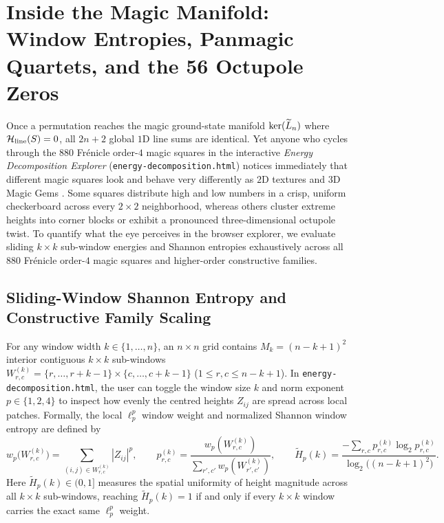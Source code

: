 \section{Inside the Magic Manifold: Window Entropies, Panmagic Quartets, and the 56 Octupole Zeros}
\label{sec:windows}

Once a permutation reaches the magic ground-state manifold $\ker(\widetilde{L}_n)$ where $\mathcal{H}_{\mathrm{line}}(S) = 0$, all $2n+2$ global $1\mathrm{D}$ line sums are identical. Yet anyone who cycles through the $880$ Fr\'enicle order-$4$ magic squares in the interactive \emph{Energy Decomposition Explorer} (\texttt{energy-decomposition.html}) notices immediately that different magic squares look and behave very differently as $2\mathrm{D}$ textures and $3\mathrm{D}$ Magic Gems \cite{dudeney1917amusements,ollerenshaw1998most,cameron2013signatura}. Some squares distribute high and low numbers in a crisp, uniform checkerboard across every $2\times 2$ neighborhood, whereas others cluster extreme heights into corner blocks or exhibit a pronounced three-dimensional octupole twist. To quantify what the eye perceives in the browser explorer, we evaluate sliding $k\times k$ sub-window energies and Shannon entropies exhaustively across all $880$ Fr\'enicle order-$4$ magic squares and higher-order constructive families.

\subsection{Sliding-Window Shannon Entropy and Constructive Family Scaling}

For any window width $k \in \{1,\dots,n\}$, an $n\times n$ grid contains $M_k = (n-k+1)^2$ interior contiguous $k\times k$ sub-windows $W_{r,c}^{(k)} = \{r,\dots,r+k-1\}\times\{c,\dots,c+k-1\}$ ($1 \le r,c \le n-k+1$). In \texttt{energy-decomposition.html}, the user can toggle the window size $k$ and norm exponent $p \in \{1,2,4\}$ to inspect how evenly the centred heights $Z_{ij}$ are spread across local patches. Formally, the local $\ell_p^p$ window weight and normalized Shannon window entropy are defined by
\begin{equation}
  w_p\bigl(W_{r,c}^{(k)}\bigr) = \sum_{(i,j)\in W_{r,c}^{(k)}} |Z_{ij}|^p, \qquad
  p_{r,c}^{(k)} = \frac{w_p(W_{r,c}^{(k)})}{\sum_{r',c'} w_p(W_{r',c'}^{(k)})}, \qquad
  \widetilde{H}_p(k) = \frac{-\sum_{r,c} p_{r,c}^{(k)} \log_2 p_{r,c}^{(k)}}{\log_2\bigl((n-k+1)^2\bigr)}.
  \label{eq:window_entropy_def}
\end{equation}
Here $\widetilde{H}_p(k) \in (0,1]$ measures the spatial uniformity of height magnitude across all $k\times k$ sub-windows, reaching $\widetilde{H}_p(k) = 1$ if and only if every $k\times k$ window carries the exact same $\ell_p^p$ weight.

